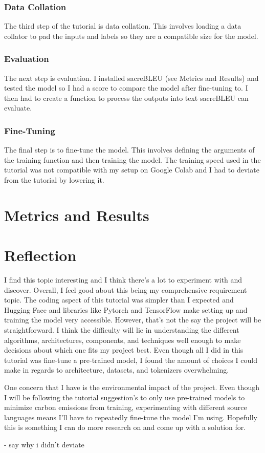 \documentclass[10pt,twocolumn]{article}
\begin{document}
\subsubsection{Data Collation}
The third step of the tutorial is data collation. This involves loading a data collator to pad the inputs and labels so they are a compatible size for the model. 

\subsubsection{Evaluation}
The next step is evaluation. I installed sacreBLEU (see Metrics and Results) and tested the model so I had a score to compare the model after fine-tuning to. I then had to create a function to process the outputs into text sacreBLEU can evaluate.

\subsubsection{Fine-Tuning}
The final step is to fine-tune the model. This involves defining the arguments of the training function and then training the model. The training speed used in the tutorial was not compatible with my setup on Google Colab and I had to deviate from the tutorial by lowering it. 

\section{Metrics and Results}



\section{Reflection}
I find this topic interesting and I think there’s a lot to experiment with and discover. Overall, I feel good about this being my comprehensive requirement topic. The coding aspect of this tutorial was simpler than I expected and Hugging Face and libraries like Pytorch and TensorFlow make setting up and training the model very accessible. 
However, that's not the say the project will be straightforward. I think the difficulty will lie in understanding the different algorithms, architectures, components, and techniques well enough to make decisions about which one fits my project best. Even though all I did in this tutorial was fine-tune a pre-trained model, I found the amount of choices I could make in regards to architecture, datasets, and tokenizers overwhelming. 

One concern that I have is the environmental impact of the project. Even though I will be following the tutorial suggestion's to only use pre-trained models to minimize carbon emissions from training, experimenting with different source languages means I'll have to repeatedly fine-tune the model I'm using. Hopefully this is something I can do more research on and come up with a solution for. 

- say why i didn't deviate
\end{document}
